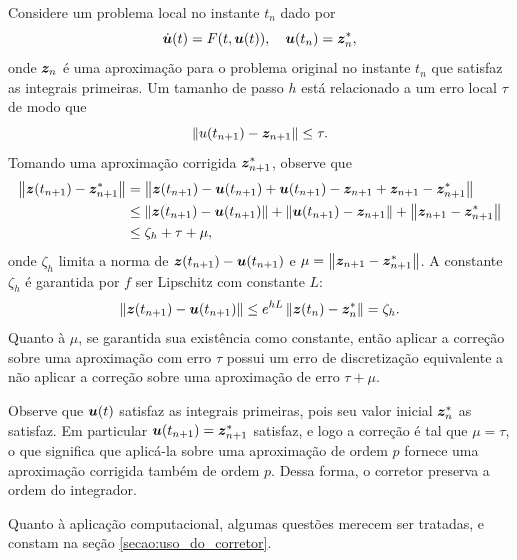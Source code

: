Considere um problema local no instante $t_n$ dado por
\begin{equation*}
    \dot {\bm u} (t) = F(t, \bm u(t)), \quad \bm u(t_n) = \bm z_n^*,
\end{equation*}
onde $\bm z_n$ é uma aproximação para o problema original no instante $t_n$ que satisfaz as integrais primeiras. Um tamanho de passo $h$ está relacionado a um erro local $\tau$ de modo que
\begin{equation*}
    \left\Vert u(t_{n+1}) - \bm z_{n+1} \right\Vert \leq \tau.
\end{equation*}
Tomando uma aproximação corrigida $\bm z_{n+1}^*$, observe que
\begin{align*}
    \left\Vert \bm z(t_{n+1}) - \bm z_{n+1}^* \right\Vert 
    & = \left\Vert \bm z(t_{n+1}) - \bm u(t_{n+1}) + \bm u(t_{n+1}) - \bm z_{n+1} + \bm z_{n+1} - \bm z_{n+1}^* \right\Vert \\
    & \leq \left\Vert \bm z(t_{n+1}) - \bm u(t_{n+1}) \right\Vert + \left\Vert \bm u(t_{n+1}) - \bm z_{n+1} \right\Vert + \left\Vert \bm z_{n+1} - \bm z_{n+1}^* \right\Vert \\
    & \leq \zeta_h + \tau + \mu,
\end{align*}
onde $\zeta_h$ limita a norma de $\bm z(t_{n+1}) - \bm u(t_{n+1})$ e $\mu = \left\Vert \bm z_{n+1} - \bm z_{n+1}^* \right\Vert$. A constante $\zeta_h$ é garantida por $f$ ser Lipschitz com constante $L$:
\begin{equation*}
    \left\Vert \bm z(t_{n+1}) - \bm u(t_{n+1}) \right\Vert \leq e^{h L} \left\Vert \bm z(t_n) - \bm z_n^* \right\Vert = \zeta_h.
\end{equation*}
Quanto à $\mu$, se garantida sua existência como constante, então aplicar a correção sobre uma aproximação com erro $\tau$ possui um erro de discretização equivalente a não aplicar a correção sobre uma aproximação de erro $\tau + \mu$. 

Observe que $\bm u(t)$ satisfaz as integrais primeiras, pois seu valor inicial $\bm z_n^*$ as satisfaz. Em particular $\bm u(t_{n+1}) = \bm z_{n+1}^*$ satisfaz, e logo a correção é tal que $\mu = \tau$, o que significa que aplicá-la sobre uma aproximação de ordem $p$ fornece uma aproximação corrigida também de ordem $p$. Dessa forma, o corretor preserva a ordem do integrador.

Quanto à aplicação computacional, algumas questões merecem ser tratadas, e constam na seção \ref{secao:uso_do_corretor}.